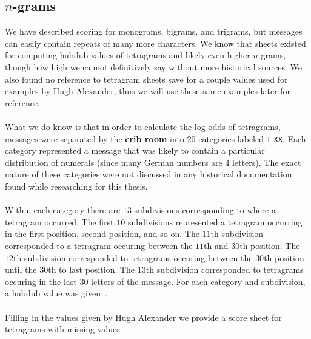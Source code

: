 \subsection{$n$-grams}
We have described scoring for monograms, bigrams, and trigrams, but
messages can easily contain repeats of many more characters. We
know that sheets existed for computing hubdub values of tetragrams
and likely even higher $n$-grams, though how high we cannot
definitively say without more historical sources. We also found no
reference to tetragram sheets save for a couple values used for
examples by Hugh Alexander, thus we will use these same examples
later for reference.
\\\\What we do know is that in order to calculate the log-odds of
tetragrams, messages were separated by the {\bf{crib room}} into
$20$ categories labeled \texttt{I}-\texttt{XX}. Each category
represented a message that was likely to contain a particular
distribution of numerals (since many German numbers are $4$
letters). The exact nature of these categories were not discussed
in any historical documentation found while researching for this thesis.
\\\\Within each category there are $13$ subdivisions corresponding
to where a tetragram occurred. The first $10$ subdivisions
represented a tetragram occurring in the first position, second
position, and so on. The $11$th subdivision corresponded to a
tetragram occuring between the $11$th and $30$th position. The
$12$th subdivision corresponded to tetragrams occuring between the
$30$th position until the $30$th to last position. The $13$th
subdivision corresponded to tetragrams occuring in the last $30$
letters of the message. For each category and subdivision, a hubdub
value was given~\cite[p.~107]{Alexander1945}.
\\\\Filling in the values given by Hugh Alexander we provide a
score sheet for tetragrams with missing values

